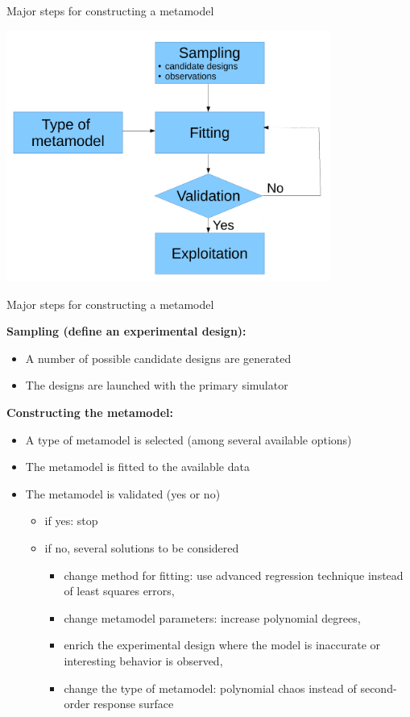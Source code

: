 \documentclass[9pt]{beamer}
\newcommand{\titx}{\usebeamercolor[fg]{subtitle}}
\begin{document}
\begin{frame}[t]{Major steps for constructing a metamodel}
 
\begin{center}
 \includegraphics[width=0.8\textwidth]{../Pics/metamodel_scheme.pdf} 
\end{center}

\end{frame}

\begin{frame}[t]{Major steps for constructing a metamodel}

{\titx \bf Sampling (define an experimental design):} 
\begin{itemize}
\item A number of possible candidate designs are generated
\item The designs are launched with the primary simulator
\end{itemize}


{\titx \bf Constructing the metamodel:}
\begin{itemize}
\item A type of metamodel is selected (among several available options)
\item The metamodel is fitted to the available data
\item The metamodel is validated (yes or no)
	\begin{itemize}
	\item if yes: stop
	\item if no, several solutions to be considered
	 \begin{itemize}
	 \item change method for fitting: use advanced regression technique instead of least squares errors,
	 \item change metamodel parameters: increase polynomial degrees,
	 \item enrich the experimental design where the model is inaccurate or interesting behavior is observed,
	 \item change the type of metamodel: polynomial chaos instead of second-order response surface
	\end{itemize}	     
	\end{itemize}
\end{itemize}

\end{frame}
\end{document}

